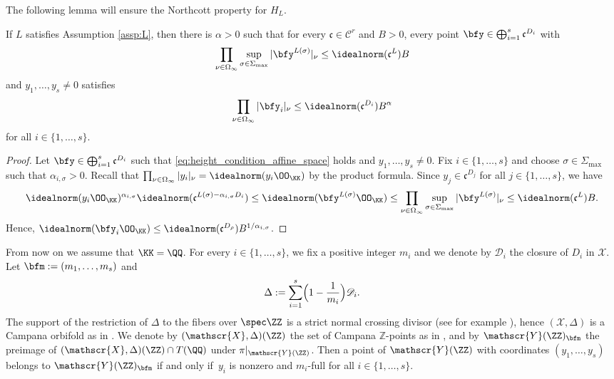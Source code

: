 The following lemma will ensure the Northcott property for $H_L$.

\begin{lemma}
\label{lem:northcott}
If $L$ satisfies Assumption \ref{assp:L},
then there is $\alpha>0$ such that for every
$\mathfrak c\in\mathcal C^r$ and $B>0$, every point
$ \bfy\in \bigoplus_{i=1}^s \mathfrak c^{D_i}$ with
\begin{equation}
\label{eq:height_condition_affine_space}
\prod_{\nu\in\Omega_\infty} \sup_{\sigma\in\Sigma_{\max}} | \bfy^{L(\sigma)}|_{\nu}
\leq \idealnorm(\mathfrak c^{L}) B
\end{equation}
and $y_1,\dots,y_s\neq0$ satisfies
\[
\prod_{\nu\in\Omega_\infty}| \bfy_i|_\nu\leq
\idealnorm(\mathfrak c^{D_{i}})B^\alpha
\]
for all $i\in\{1,\dots,s\}$.
\end{lemma}
\begin{proof}
Let $ \bfy\in \bigoplus_{i=1}^s \mathfrak c^{D_i}$
such that \eqref{eq:height_condition_affine_space} holds
and $y_1,\dots,y_s\neq0$.
Fix $i\in\{1,\dots,s\}$ and choose $\sigma\in \Sigma_{\max}$ such that
$\alpha_{i,\sigma}>0$.
Recall that $\prod_{\nu\in\Omega_\infty}|y_i |_\nu=\idealnorm(y_i \OO_{\KK})$
by the product formula.
Since $y_{j}\in\mathfrak c^{D_{j}}$
for all $j\in\{1,\dots,s\}$, we have
\[
\idealnorm(y_i\OO_{\KK})^{\alpha_{i,\sigma}}
\idealnorm(\mathfrak c^{L(\sigma)-\alpha_{i,\sigma}D_i})
\leq \idealnorm(\bfy^{L(\sigma)}\OO_{\KK})
\leq \prod_{\nu\in\Omega_\infty} \sup_{\sigma\in\Sigma_{\max}} | \bfy^{L(\sigma)} |_{\nu}
\leq \idealnorm(\mathfrak c^{L})B.
\]
Hence, $\idealnorm(\bfy_i\OO_{\KK})
\leq \idealnorm (\mathfrak c^{D_\rho})B^{1/\alpha_{i,\sigma}}$.
\end{proof}

\label{sec:campana}

From now on we assume that $\KK=\QQ$.
For every $i\in\{1,\dots,s\}$, we fix a positive integer $m_i$
and we denote by $\mathscr D_i$ the closure of $D_i$ in $\mathscr X$.
Let $\bfm:=(m_1,\dots,m_s)$ and
\[
\Delta:=\sum_{i=1}^s\Bigl(1-\frac 1{m_i}\Bigr) \mathscr D_i.
\]
The support of the restriction of $\Delta$ to the fibers over $\spec\ZZ$ is a strict
normal crossing divisor (see for example \cite[\S 5.1]{MR2740045}),
hence $(\mathscr{X},\Delta)$ is a Campana orbifold as in \cite[Def.\,3.1]{PSTVA}.
We denote by $(\mathscr{X},\Delta)(\ZZ)$ the set of Campana
$\mathbb Z$-points as in \cite[Def.\,3.4]{PSTVA}, and
by $\mathscr{Y}(\ZZ)_\bfm$ the preimage of
$(\mathscr{X},\Delta)(\ZZ)\cap T(\QQ)$ under $\pi|_{\mathscr{Y}(\ZZ)}$.
Then a point of $\mathscr{Y}(\ZZ)$ with coordinates
$(y_1,\dots,y_s)$ belongs to $\mathscr{Y}(\ZZ)_\bfm$
if and only if~$y_i$ is nonzero and $m_i$-full for all $i\in\{1,\dots,s\}$.


